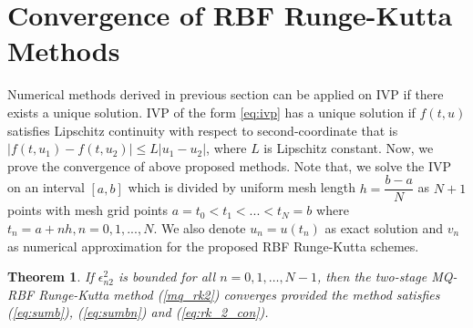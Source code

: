 \documentclass[a4paper, preprint,11pt]{elsarticle}
\newtheorem{theorem}{Theorem}[section]
\numberwithin{equation}{section}
\begin{document}
\section{Convergence of RBF Runge-Kutta Methods}
Numerical methods derived in previous section can be applied on IVP if there exists a unique solution. IVP of the form {\eqref{eq:ivp}} has a unique solution if $f(t,u)$ satisfies Lipschitz continuity with respect to second-coordinate that is $|f(t,u_1) - f(t,u_2)| \leq L|u_1 - u_2|$, where $L$ is Lipschitz constant. Now, we prove the convergence of above proposed methods. Note that, we solve the IVP on an interval $[a,b]$ which is divided by uniform mesh length $h=\dfrac{b-a}{N}$ as $N+1$ points with mesh grid points $a=t_0 < t_1<...<t_N=b$ where $t_n=a+nh, n=0,1,...,N.$ We also denote $u_n=u(t_n)$ as exact solution and $v_n$ as numerical approximation for the proposed RBF Runge-Kutta schemes.
\begin{theorem}
    If $\epsilon_{n2}^2$
is bounded for all $n = 0, 1, \dots, N - 1$, then the
two-stage MQ-RBF Runge-Kutta method (\ref{mq_rk2}) converges provided the method satisfies (\ref{eq:sumb}), (\ref{eq:sumbn}) and
(\ref{eq:rk_2_con}).
\end{theorem} 
\end{document}
